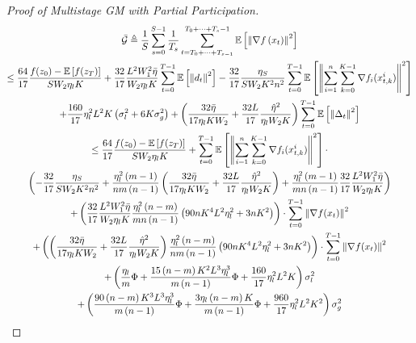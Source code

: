 \begin{proof}[Proof of Multistage GM with Partial Participation]
\begin{equation}
\begin{gathered}
\Bar{\mathcal{G}}\triangleq\frac{1}{S}\sum_{s=0}^{S-1} \frac{1}{T_s}\sum_{t=T_0+\dots+T_{s-1} }^{T_0+\dots+T_s-1} \mathbb{E}\left [\left\| \nabla f\left(x_t\right) \right\|^2\right]\\
\leq \frac{64}{17}\frac{f(z_0)-\mathbb{E}\left[f(z_{T})\right]}{S W_2 \eta_l K} + \frac{32}{17} \frac{L^2 W_1^2 \Bar{\eta}}{W_2\eta_l K}\sum_{t=0}^{T-1}\mathbb{E}\left[\left\| d_t\right\|^2\right] - \frac{32}{17}\frac{\eta_S}{S W_2 K^2 n^2}\sum_{t=0}^{T-1} \mathbb{E}\left[\left\| \sum_{i=1}^n\sum_{k=0}^{K-1} \nabla f_i(x_{t,k}^i)\right\|^2\right] \\
+ \frac{160}{17} \eta_l^2L^2K \left(\sigma_l^2+6K\sigma_g^2\right) + \left(\frac{32\Bar{\eta}}{17\eta_lK W_2} + \frac{32 L}{17}\frac{\hat{\eta}^2}{\eta_l  W_2 K}\right)\sum_{t=0}^{T-1}\mathbb{E}\left[\left\|\Delta_t\right\|^2\right]\\
\leq \frac{64}{17}\frac{f(z_0)-\mathbb{E}\left[f(z_{T})\right]}{S W_2 \eta_l K} + \sum_{t=0}^{T-1} \mathbb{E}\left[\left\| \sum_{i=1}^n\sum_{k=0}^{K-1} \nabla f_i(x_{t,k}^i)\right\|^2\right] \cdot\\
\left( - \frac{32}{17}\frac{\eta_S}{S W_2 K^2 n^2} + \frac{\eta_l^2 \left(m-1\right)}{nm\left(n-1\right)} \left(\frac{32 \Bar{\eta}}{17 \eta_l K W_2} + \frac{32 L}{17}\frac{\hat{\eta}^2}{\eta_l W_2 K}\right) + \frac{\eta_l^2\left(m-1\right)}{mn\left(n-1\right)} \frac{32}{17} \frac{L^2 W_1^2 \Bar{\eta}}{W_2 \eta_l K}\right)\\
+\left( \frac{32}{17} \frac{L^2 W_1^2 \Bar{\eta}}{W_2 \eta_l K}\frac{\eta_l^2\left(n-m\right)}{m n\left(n-1\right)}\left(90nK^4L^2\eta_l^2+3nK^2\right)\right)\cdot \sum_{t=0}^{T-1}\left\|\nabla f(x_t)\right\|^2 \\
+  \left(\left(\frac{32\Bar{\eta}}{17 \eta_l K W_2} + \frac{32 L}{17}\frac{\hat{\eta}^2}{\eta_l W_2 K}\right)\frac{\eta_l^2\left(n-m\right)}{n m \left( n - 1 \right)}\left(90nK^4L^2\eta_l^2 + 3nK^2\right) \right)
\cdot \sum_{t=0}^{T-1}\left\|\nabla f(x_t)\right\|^2\\
+ \left( \frac{\eta_l}{m}\Phi +\frac{15\left(n-m\right)K^2L^3\eta_l^3}{m\left(n-1\right)}\Phi + \frac{160}{17} \eta_l^2L^2K \right)\sigma_l^2\\
+ \left(  \frac{90\left(n-m\right)K^3L^3\eta_l^3}{m\left(n-1\right)}\Phi  +  \frac{3\eta_l\left(n-m\right)K}{m\left(n-1\right)}\Phi     + \frac{960}{17} \eta_l^2L^2K^2         \right)\sigma_g^2
\end{gathered}\nonumber
\end{equation}


\end{proof}

